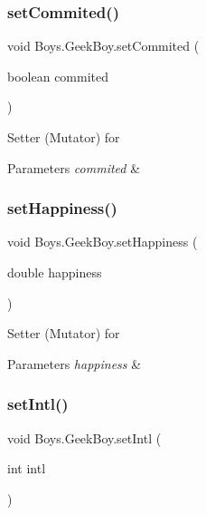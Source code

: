 \subsubsection{\texorpdfstring{set\+Commited()}{setCommited()}}
{\footnotesize\ttfamily void Boys.\+Geek\+Boy.\+set\+Commited (\begin{DoxyParamCaption}\item[{boolean}]{commited }\end{DoxyParamCaption})\hspace{0.3cm}{\ttfamily [inline]}}

Setter (Mutator) for 
\begin{DoxyParams}{Parameters}
{\em commited} & \\
\hline
\end{DoxyParams}
\mbox{\label{class_boys_1_1_geek_boy_a46cb7cb2796b75c4fae17512610cf6c8}} 
\subsubsection{\texorpdfstring{set\+Happiness()}{setHappiness()}}
{\footnotesize\ttfamily void Boys.\+Geek\+Boy.\+set\+Happiness (\begin{DoxyParamCaption}\item[{double}]{happiness }\end{DoxyParamCaption})\hspace{0.3cm}{\ttfamily [inline]}}

Setter (Mutator) for 
\begin{DoxyParams}{Parameters}
{\em happiness} & \\
\hline
\end{DoxyParams}
\mbox{\label{class_boys_1_1_geek_boy_a62be6e4824a7e65b95d2e8d4aebc9e3d}} 
\subsubsection{\texorpdfstring{set\+Intl()}{setIntl()}}
{\footnotesize\ttfamily void Boys.\+Geek\+Boy.\+set\+Intl (\begin{DoxyParamCaption}\item[{int}]{intl }\end{DoxyParamCaption})\hspace{0.3cm}{\ttfamily [inline]}}


